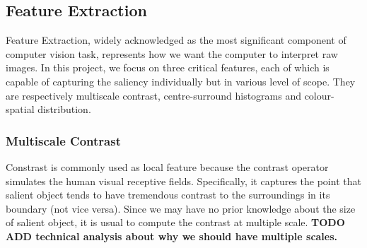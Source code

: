 \documentclass[10pt,twocolumn,letterpaper]{article}
\newcommand{\BOLD}{\textbf}
\begin{document}
\subsection{Feature Extraction}
Feature Extraction, widely acknowledged as the most significant component of computer vision task, represents how we want the computer to interpret raw images. In this project, we focus on three critical features, each of which is capable of capturing the saliency individually but in various level of scope. They are respectively multiscale contrast, centre-surround histograms  and colour-spatial distribution. 
\subsubsection{Multiscale Contrast}

Constrast is commonly used as local feature because the contrast operator simulates the human visual receptive fields. Specifically, it captures the point that salient object tends to have tremendous contrast to the surroundings in its boundary (not vice versa). Since we may have no prior knowledge about the size of salient object, it is usual to compute the contrast at multiple scale. 
\BOLD{TODO ADD technical analysis about why we should have multiple scales.}
\end{document}
